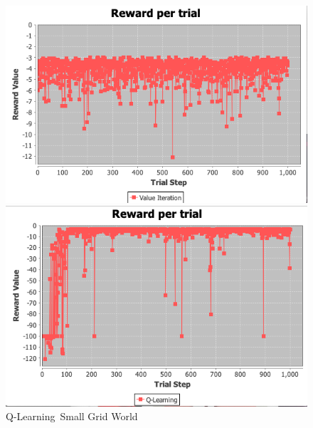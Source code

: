 \documentclass[11pt]{article}
\newcommand{\problemone}{Small Grid World}
\begin{document}
    \begin{figure}
        \begin{minipage}{0.5\textwidth}
            \centering
            \includegraphics[width=1\linewidth]{valueiterationreward.png}
            \caption{Value Iteration~\problemone}\label{Fig:Value Iteration~\problemone}
        \end{minipage}
        \begin{minipage}{0.5\textwidth}
            \centering
            \includegraphics[width=1\linewidth]{qlearningreward.png}
            \caption{Q-Learning~\problemone}\label{Fig:Q-Learning~\problemone}
        \end{minipage}
    \end{figure}
\end{document}
